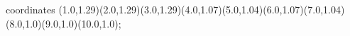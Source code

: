 					coordinates { (1.0,1.29)(2.0,1.29)(3.0,1.29)(4.0,1.07)(5.0,1.04)(6.0,1.07)(7.0,1.04)(8.0,1.0)(9.0,1.0)(10.0,1.0)};